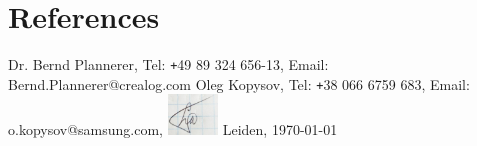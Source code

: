 \documentclass[11pt,a4paper,sans]{moderncv} %
\begin{document}
\section{References}
{Dr. Bernd Plannerer, Tel: \texttt{+}49 89 324 656-13, Email: Bernd.Plannerer@crealog.com}
	{Oleg Kopysov, Tel: \texttt{+}38 066 6759 683, Email: o.kopysov@samsung.com, 
	\newline{} \newline{} \newline{} \newline{}
	\includegraphics[width=0.1\textwidth]{signatureIB.jpg}	
	\newline{} \newline{}	
	Leiden, \hspace{20pt} \today  \newline{}	
}
\end{document}
